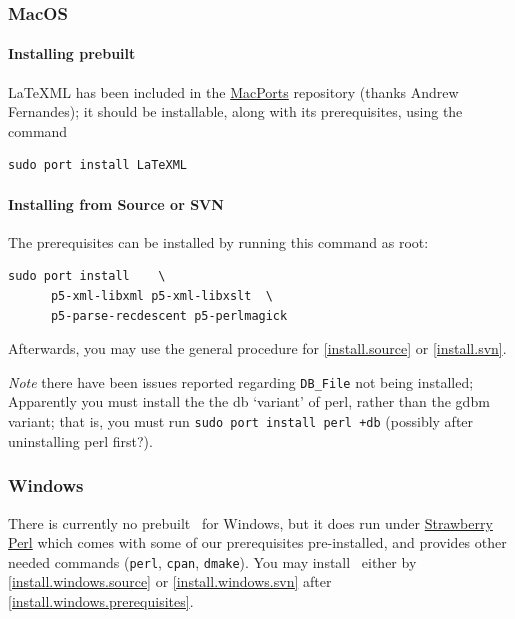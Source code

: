 \documentclass{article}
\begin{document}

\subsubsection{MacOS}\label{install.macos}
\paragraph{Installing prebuilt}
LaTeXML has been included in the \href{http://www.macports.org}{MacPorts}
repository (thanks Andrew Fernandes);
it should be installable, along with its prerequisites, using the command
\begin{lstlisting}[style=shell]
  sudo port install LaTeXML
\end{lstlisting}


\paragraph{Installing from Source or SVN}
The prerequisites can be installed by running this command as root: 
\begin{lstlisting}[style=shell]
  sudo port install    \
      p5-xml-libxml p5-xml-libxslt  \
      p5-parse-recdescent p5-perlmagick
\end{lstlisting}
Afterwards, you may use the general procedure for
\ref{install.source} or \ref{install.svn}.

\emph{Note} there have been issues reported regarding \verb|DB_File|
not being installed;  Apparently you must install the 
the db `variant' of perl, rather than the gdbm variant;
that is, you must run \verb|sudo port install perl +db|
(possibly after uninstalling perl first?).

\subsubsection{Windows}\label{install.windows}
There is currently no prebuilt \LaTeXML\ for Windows,
but it does run under \href{http://strawberryperl.com}{Strawberry Perl}
which comes with some of our prerequisites pre-installed,
and provides other needed commands (\texttt{perl}, \texttt{cpan}, \texttt{dmake}).
You may install \LaTeXML\ either by \ref{install.windows.source}
or \ref{install.windows.svn} after \ref{install.windows.prerequisites}.
\end{document}

